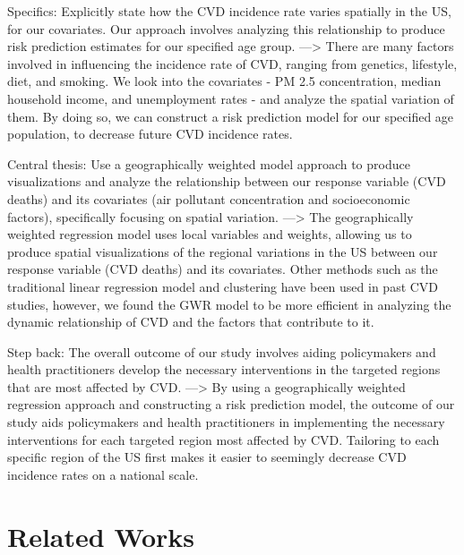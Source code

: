 \documentclass[
]{article}
\begin{document}
Specifics: Explicitly state how the CVD incidence rate varies spatially
in the US, for our covariates. Our approach involves analyzing this
relationship to produce risk prediction estimates for our specified age
group. ---\textgreater{} There are many factors involved in influencing
the incidence rate of CVD, ranging from genetics, lifestyle, diet, and
smoking. We look into the covariates - PM 2.5 concentration, median
household income, and unemployment rates - and analyze the spatial
variation of them. By doing so, we can construct a risk prediction model
for our specified age population, to decrease future CVD incidence
rates.

Central thesis: Use a geographically weighted model approach to produce
visualizations and analyze the relationship between our response
variable (CVD deaths) and its covariates (air pollutant concentration
and socioeconomic factors), specifically focusing on spatial variation.
---\textgreater{} The geographically weighted regression model uses
local variables and weights, allowing us to produce spatial
visualizations of the regional variations in the US between our response
variable (CVD deaths) and its covariates. Other methods such as the
traditional linear regression model and clustering have been used in
past CVD studies, however, we found the GWR model to be more efficient
in analyzing the dynamic relationship of CVD and the factors that
contribute to it.

Step back: The overall outcome of our study involves aiding policymakers
and health practitioners develop the necessary interventions in the
targeted regions that are most affected by CVD. ---\textgreater{} By
using a geographically weighted regression approach and constructing a
risk prediction model, the outcome of our study aids policymakers and
health practitioners in implementing the necessary interventions for
each targeted region most affected by CVD. Tailoring to each specific
region of the US first makes it easier to seemingly decrease CVD
incidence rates on a national scale.

\section{Related Works}\label{related-works}
\end{document}
